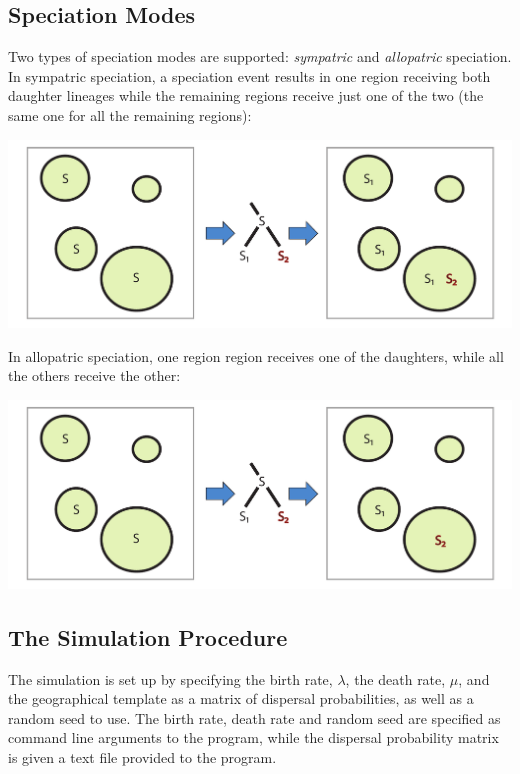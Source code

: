 \documentclass[11pt]{article}
\begin{document}
\subsection*{Speciation Modes}

Two types of speciation modes are supported: \textit{sympatric} and \textit{allopatric} speciation.
In sympatric speciation, a speciation event results in one region receiving both daughter lineages while the remaining regions receive just one of the two (the same one for all the remaining regions):

\begin{center}
	\includegraphics[scale=0.3]{sympatric-speciation.pdf}
\end{center}


In allopatric speciation, one region region receives one of the daughters, while all the others receive the other:

\begin{center}
	\includegraphics[scale=0.3]{allopatric-speciation.pdf}
\end{center}

\subsection*{The Simulation Procedure}
The simulation is set up by specifying the birth rate, $\lambda$, the death rate, $\mu$, and the geographical template as a matrix of dispersal probabilities, as well as a random seed to use.
The birth rate, death rate and random seed are specified as command line arguments to the program, while the dispersal probability matrix is given a text file provided to the program.
\end{document}
